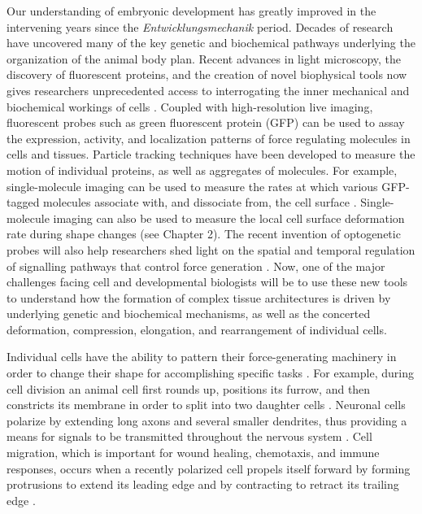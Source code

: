 \documentclass{ucetd}
\begin{document}
Our understanding of embryonic development has greatly improved in the intervening years since the \textit{Entwicklungsmechanik} period.  Decades of research have uncovered many of the key genetic and biochemical pathways underlying the organization of the animal body plan.  Recent advances in light microscopy, the discovery of fluorescent proteins, and the creation of novel biophysical tools now gives researchers unprecedented access to interrogating the inner mechanical and biochemical workings of cells \cite{Heisenberg:2013jk}.  Coupled with high-resolution live imaging, fluorescent probes such as green fluorescent protein (GFP) can be used to assay the expression, activity, and localization patterns of force regulating molecules in cells and tissues.  Particle tracking techniques have been developed to measure the motion of individual proteins, as well as aggregates of molecules.  For example, single-molecule imaging can be used to measure the rates at which various GFP-tagged molecules associate with, and dissociate from, the cell surface \cite{Robin:2014jf}.  Single-molecule imaging can also be used to measure the local cell surface deformation rate during shape changes  (see Chapter 2).  The recent invention of optogenetic probes will also help researchers shed light on the spatial and temporal regulation of signalling pathways that control force generation \cite{Wagner:2016ev}.   Now, one of the major challenges facing cell and developmental biologists will be to use these new tools to understand how the formation of complex tissue architectures is driven by underlying genetic and biochemical mechanisms, as well as the concerted deformation, compression, elongation, and rearrangement of individual cells.




Individual cells have the ability to pattern their force-generating machinery in order to change their shape for accomplishing specific tasks \cite{Lecuit:2011ec}.  For example, during cell division an animal cell first rounds up, positions its furrow, and then constricts its membrane in order to split into two daughter cells \cite{Srivastava:2016dm}.  Neuronal cells polarize by extending long axons and several smaller dendrites, thus providing a means for signals to be transmitted throughout the nervous system  \cite{Stiess:2011ji}.  Cell migration, which is important for wound healing, chemotaxis, and immune responses, occurs when a recently polarized cell propels itself forward by forming protrusions to extend its leading edge and by contracting to retract its trailing edge \cite{Mayor:2016iw}.
\end{document}
